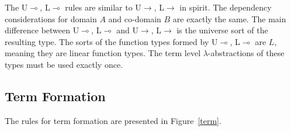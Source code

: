 \documentclass[sigplan,screen,review,anonymous]{acmart}
\newcommand{\rname}[1]{\textsc{\footnotesize #1}}
\begin{document}
The \rname{U$\multimap$}, \rname{L$\multimap$} rules are similar to \rname{U$\rightarrow$}, \rname{L$\rightarrow$} in spirit. The dependency considerations for domain $A$ and co-domain $B$ are exactly the same. The main difference between \rname{U$\multimap$}, \rname{L$\multimap$} and \rname{U$\rightarrow$}, \rname{L$\rightarrow$} is the universe sort of the resulting type. The sorts of the function types formed by \rname{U$\multimap$}, \rname{L$\multimap$} are $L$, meaning they are linear function types. The term level $\lambda$-abstractions of these types must be used exactly once.

\subsection{Term Formation} \label{teformation}
The rules for term formation are presented in Figure~\ref{term}.
\end{document}
